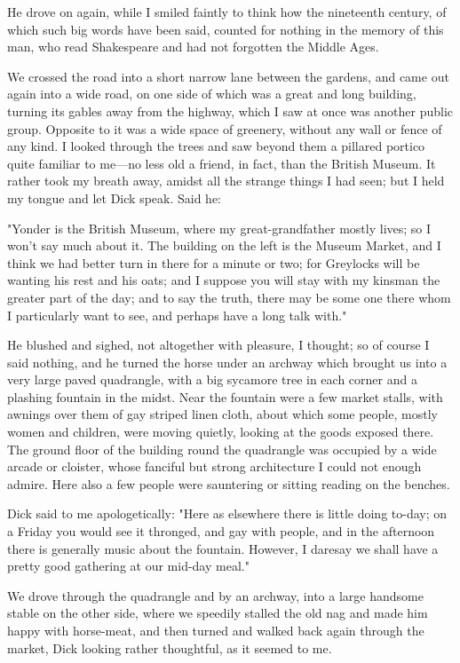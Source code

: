 He drove on again, while I smiled faintly to think how the nineteenth
century, of which such big words have been said, counted for nothing in
the memory of this man, who read Shakespeare and had not forgotten the
Middle Ages.

We crossed the road into a short narrow lane between the gardens, and
came out again into a wide road, on one side of which was a great and
long building, turning its gables away from the highway, which I saw at
once was another public group. Opposite to it was a wide space of
greenery, without any wall or fence of any kind. I looked through the
trees and saw beyond them a pillared portico quite familiar to me---no
less old a friend, in fact, than the British Museum. It rather took my
breath away, amidst all the strange things I had seen; but I held my
tongue and let Dick speak. Said he:

"Yonder is the British Museum, where my great-grandfather mostly lives;
so I won't say much about it. The building on the left is the Museum
Market, and I think we had better turn in there for a minute or two; for
Greylocks will be wanting his rest and his oats; and I suppose you will
stay with my kinsman the greater part of the day; and to say the truth,
there may be some one there whom I particularly want to see, and perhaps
have a long talk with."

He blushed and sighed, not altogether with pleasure, I thought; so of
course I said nothing, and he turned the horse under an archway which
brought us into a very large paved quadrangle, with a big sycamore tree
in each corner and a plashing fountain in the midst. Near the fountain
were a few market stalls, with awnings over them of gay striped linen
cloth, about which some people, mostly women and children, were moving
quietly, looking at the goods exposed there. The ground floor of the
building round the quadrangle was occupied by a wide arcade or cloister,
whose fanciful but strong architecture I could not enough admire. Here
also a few people were sauntering or sitting reading on the benches.

Dick said to me apologetically: "Here as elsewhere there is little doing
to-day; on a Friday you would see it thronged, and gay with people, and
in the afternoon there is generally music about the fountain. However, I
daresay we shall have a pretty good gathering at our mid-day meal."

We drove through the quadrangle and by an archway, into a large handsome
stable on the other side, where we speedily stalled the old nag and made
him happy with horse-meat, and then turned and walked back again through
the market, Dick looking rather thoughtful, as it seemed to me.

